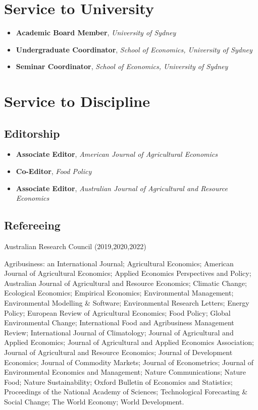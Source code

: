 \documentclass[10pt]{article}
\begin{document}
	\bigskip
	
	\section*{Service to University}
	\begin{itemize}
		\item {} \textbf{Academic Board Member}, \textsl{University of Sydney}
		\item {} \textbf{Undergraduate Coordinator}, \textsl{School of Economics, University of Sydney}
		\item {} \textbf{Seminar Coordinator}, \textsl{School of Economics, University of Sydney}
	\end{itemize}
	
	
	\section*{Service to Discipline}
	
	\subsection*{Editorship}
	\begin{itemize}
		\item {} \textbf{Associate Editor}, \textsl{American Journal of Agricultural Economics}
		\item {} \textbf{Co-Editor}, \textsl{Food Policy}
		\item {} \textbf{Associate Editor}, \textsl{Australian Journal of Agricultural and Resource Economics}
	\end{itemize}
	
	\subsection*{Refereeing}
	Australian Research Council (2019,2020,2022)
	
	\medskip

	Agribusiness: an International Journal; Agricultural Economics; American Journal of Agricultural Economics; Applied Economics Perspectives and Policy; Australian Journal of Agricultural and Resource Economics; Climatic Change; Ecological Economics; Empirical Economics; Environmental Management; Environmental Modelling \& Software; Environmental Research Letters; Energy Policy; European Review of Agricultural Economics; Food Policy; Global Environmental Change; International Food and Agribusiness Management Review; International Journal of Climatology; Journal of Agricultural and Applied Economics; Journal of Agricultural and Applied Economics Association; Journal of Agricultural and Resource Economics; Journal of Development Economics; Journal of Commodity Markets; Journal of Econometrics; Journal of Environmental Economics and Management; Nature Communications; Nature Food; Nature Sustainability; Oxford Bulletin of Economics and Statistics; Proceedings of the National Academy of Sciences; Technological Forecasting \& Social Change; The World Economy; World Development.
	
\end{document}
